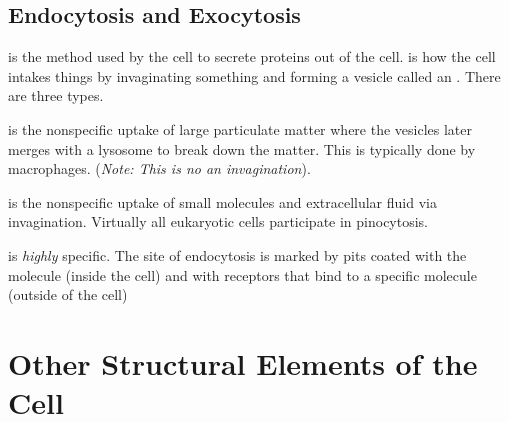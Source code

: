 \documentclass[../Bio_chemistryReview.tex]{subfiles}
\begin{document}
\subsection{Endocytosis and Exocytosis}
 is the method used by the cell to secrete proteins out of
the cell.  is how the cell intakes things by invaginating
something and forming a vesicle called an . There are three
types.\par

 is the nonspecific uptake of large particulate matter
where the vesicles later merges with a lysosome to break down the matter. This
is typically done by macrophages. (\textit{Note: This is no an
invagination}).\par

 is the nonspecific uptake of small molecules and
extracellular fluid via invagination. Virtually all eukaryotic cells participate
in pinocytosis.\par

 is \textit{highly} specific. The site of
endocytosis is marked by pits coated with the molecule 
(inside the cell) and with receptors that bind to a specific molecule (outside
of the cell)

\section{Other Structural Elements of the Cell}
\end{document}
